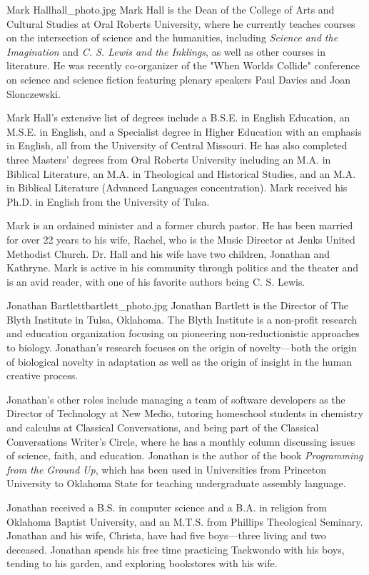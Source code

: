 \begin{authorbio}{Mark Hall}{hall_photo.jpg}
Mark Hall is the Dean of the College of Arts and Cultural Studies at Oral Roberts University, where he currently teaches courses on the intersection of science and the humanities, including \textit{Science and the Imagination} and \textit{C. S. Lewis and the Inklings}, as well as other courses in literature.  He was recently co-organizer of the "When Worlds Collide" conference on science and science fiction featuring plenary speakers Paul Davies and Joan Slonczewski.

Mark Hall’s extensive list of degrees include a B.S.E. in English Education, an M.S.E. in English, and a Specialist degree in Higher Education with an emphasis in English, all from the University of Central Missouri.  He has also completed three Masters' degrees from Oral Roberts University including an M.A. in Biblical Literature, an M.A. in Theological and Historical Studies, and an M.A. in  Biblical Literature (Advanced Languages concentration).  Mark received his Ph.D. in English from the University of Tulsa.  

Mark is an ordained minister and a former church pastor.  He has been married for over 22 years to his wife, Rachel, who is the Music Director at Jenks United Methodist Church. Dr. Hall and his wife have two children, Jonathan and Kathryne.   Mark is active in his community through politics and the theater and is an avid reader, with one of his favorite authors being C. S. Lewis.
\end{authorbio}

\begin{authorbio}{Jonathan Bartlett}{bartlett_photo.jpg}
Jonathan Bartlett is the Director of The Blyth Institute in Tulsa, Oklahoma.  The Blyth Institute is a non-profit research and education organization focusing on pioneering non-reductionistic approaches to biology.  Jonathan's research focuses on the origin of novelty---both the origin of biological novelty in adaptation as well as the origin of insight in the human creative process. 

Jonathan's other roles include managing a team of software developers as the Director of Technology at New Medio, tutoring homeschool students in chemistry and calculus at Classical Conversations, and being part of the Classical Conversations Writer's Circle, where he has a monthly column discussing issues of science, faith, and education.  Jonathan is the author of the book \textit{Programming from the Ground Up}, which has been used in Universities from Princeton University to Oklahoma State for teaching undergraduate assembly language.

Jonathan received a B.S. in computer science and a B.A. in religion from Oklahoma Baptist University, and an M.T.S. from Phillips Theological Seminary.  Jonathan and his wife, Christa, have had five boys---three living and two deceased.  Jonathan spends his free time practicing Taekwondo with his boys, tending to his garden, and exploring bookstores with his wife.
\end{authorbio}

